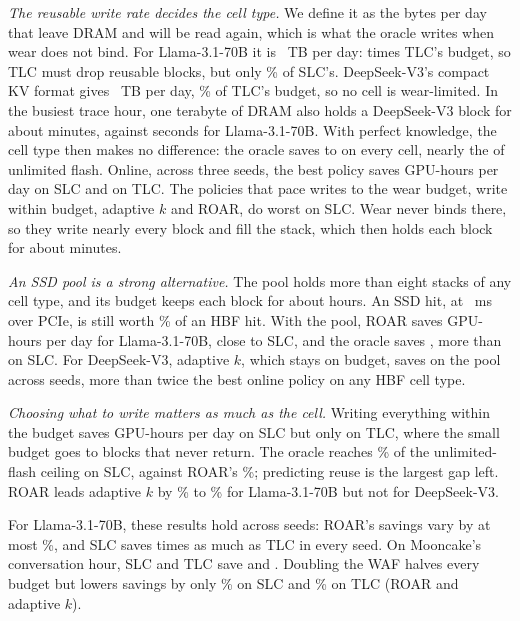 \documentclass[journal]{IEEEtran}
\begin{document}
\emph{The reusable write rate decides the cell type.} We define it as the bytes per day that leave DRAM and will be read again, which is what the oracle writes when wear does not bind. For Llama-3.1-70B it is \SimReusableL{}~TB per day: \SimReusableLOverTLC{} times TLC's budget, so TLC must drop reusable blocks, but only \SimReusableLOverSLCPct{}\% of SLC's. DeepSeek-V3's compact KV format gives \SimReusableDS{}~TB per day, \SimReusableDSOverTLCPct{}\% of TLC's budget, so no cell is wear-limited. In the busiest trace hour, one terabyte of DRAM also holds a DeepSeek-V3 block for about \DramResDSmin{} minutes, against \DramResLs{} seconds for Llama-3.1-70B. With perfect knowledge, the cell type then makes no difference: the oracle saves \SimDsOracleMin{} to \SimDsOracleMax{} on every cell, nearly the \SimCeilDS{} of unlimited flash. Online, across three seeds, the best policy saves \SimSeedDsSlcRange{} GPU-hours per day on SLC and \SimSeedDsTlcRange{} on TLC. The policies that pace writes to the wear budget, write within budget, adaptive $k$ and ROAR, do worst on SLC. Wear never binds there, so they write nearly every block and fill the stack, which then holds each block for about \SimDsSlcResMin{} minutes.

\emph{An SSD pool is a strong alternative.} The pool holds more than eight stacks of any cell type, and its budget keeps each block for about \SsdResThreeH{} hours. An SSD hit, at \TDramMs{}~ms over PCIe, is still worth \SimSsdHitValuePct{}\% of an HBF hit. With the pool, ROAR saves \SimRoarSSD{} GPU-hours per day for Llama-3.1-70B, close to SLC, and the oracle saves \SimOracleSSD{}, more than on SLC. For DeepSeek-V3, adaptive $k$, which stays on budget, saves \SimSeedDsSsdAkRange{} on the pool across seeds, more than twice the best online policy on any HBF cell type.

\emph{Choosing what to write matters as much as the cell.} Writing everything within the budget saves \SimWaSLC{} GPU-hours per day on SLC but only \SimWaTLC{} on TLC, where the small budget goes to blocks that never return. The oracle reaches \SimOracleSlcCeilPct{}\% of the unlimited-flash ceiling on SLC, against ROAR's \SimRoarSlcCeilPct{}\%; predicting reuse is the largest gap left. ROAR leads adaptive $k$ by \SimRoarOverAkMin{}\% to \SimRoarOverAkMax{}\% for Llama-3.1-70B but not for DeepSeek-V3.

For Llama-3.1-70B, these results hold across seeds: ROAR's savings vary by at most \SimSeedSpreadMax{}\%, and SLC saves \SimSeedRatioRange{} times as much as TLC in every seed. On Mooncake's conversation hour, SLC and TLC save \SimConvRoarSLC{} and \SimConvRoarTLC{}. Doubling the WAF halves every budget but lowers savings by only \SimWafTwoDropRangeSLC{}\% on SLC and \SimWafTwoDropRangeTLC{}\% on TLC (ROAR and adaptive $k$).
\end{document}
